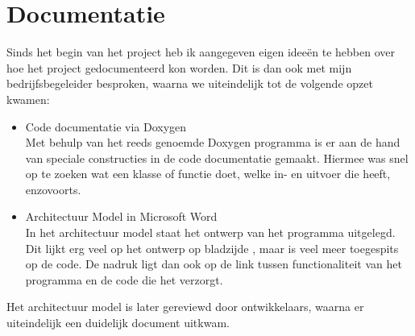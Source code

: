 \section{Documentatie}

Sinds het begin van het project heb ik aangegeven eigen idee\"en te hebben over hoe het project gedocumenteerd kon worden. Dit is dan ook met mijn bedrijfsbegeleider besproken, waarna we uiteindelijk tot de volgende opzet kwamen:

\begin{itemize}
\item Code documentatie via Doxygen \\
Met behulp van het reeds genoemde Doxygen programma is er aan de hand van speciale constructies in de code documentatie gemaakt. Hiermee was snel op te zoeken wat een klasse of functie doet, welke in- en uitvoer die heeft, enzovoorts.
\item Architectuur Model in Microsoft Word \\
In het architectuur model staat het ontwerp van het programma uitgelegd. Dit lijkt erg veel op het ontwerp op bladzijde \pageref{ontwerp}, maar is veel meer toegespits op de code. De nadruk ligt dan ook op de link tussen functionaliteit van het programma en de code die het verzorgt.
\end{itemize}

Het architectuur model is later gereviewd door ontwikkelaars, waarna er uiteindelijk een duidelijk document uitkwam.
